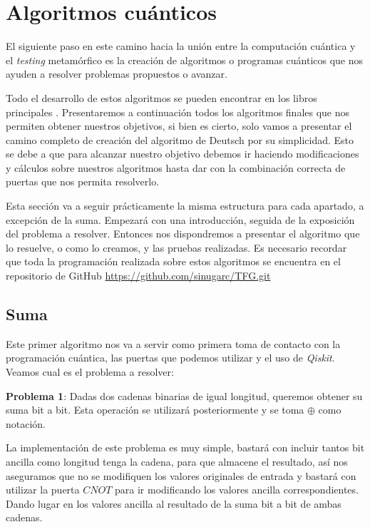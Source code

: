 \cleardoublepage

\chapter{Algoritmos cuánticos}
\label{Cap3:Algoritmos}

El siguiente paso en este camino hacia la unión entre la computación cuántica y el \textit{testing} metamórfico es la creación de algoritmos o programas cuánticos que nos ayuden a resolver problemas propuestos o avanzar. \newline

Todo el desarrollo de estos algoritmos se pueden encontrar en los libros principales \cite{B:Nielsen:2002}\cite{B:QuantumScientist:2008}. Presentaremos a continuación todos los algoritmos finales que nos permiten obtener nuestros objetivos, si bien es cierto, solo vamos a presentar el camino completo de creación del algoritmo de Deutsch por su simplicidad. Esto se debe a que para alcanzar nuestro objetivo debemos ir haciendo modificaciones y cálculos sobre nuestros algoritmos hasta dar con la combinación correcta de puertas que nos permita resolverlo.\newline

Esta sección va a seguir prácticamente la misma estructura para cada apartado, a excepción de la suma. Empezará con una introducción, seguida de la exposición del problema a resolver. Entonces nos dispondremos a presentar el algoritmo que lo resuelve, o como lo creamos, y las pruebas realizadas. Es necesario recordar que toda la programación realizada sobre estos algoritmos se encuentra en el repositorio de GitHub \url{https://github.com/sinugarc/TFG.git}

\section{Suma}
\label{Sec3.1:Suma}
 Este primer algoritmo nos va a servir como primera toma de contacto con la programación cuántica, las puertas que podemos utilizar y el uso de \textit{Qiskit}. Veamos cual es el problema a resolver:\newline

 \textbf{Problema 1}: Dadas dos cadenas binarias de igual longitud, queremos obtener su suma bit a bit. Esta operación se utilizará posteriormente y se toma $\oplus$ como notación. \newpage

 La implementación de este problema es muy simple, bastará con incluir tantos bit ancilla como longitud tenga la cadena, para que almacene el resultado, así nos aseguramos que no se modifiquen los valores originales de entrada y bastará con utilizar la puerta $CNOT$ para ir modificando los valores ancilla correspondientes. Dando lugar en los valores ancilla al resultado de la suma bit a bit de ambas cadenas.\newline


